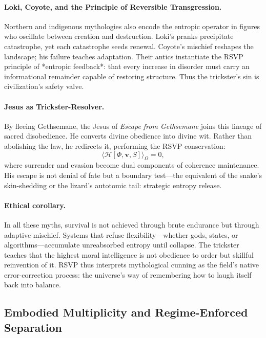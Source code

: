 \documentclass[12pt]{article}
\begin{document}
\paragraph{Loki, Coyote, and the Principle of Reversible Transgression.}
Northern and indigenous mythologies also encode the entropic operator in figures who oscillate between creation and destruction.  
Loki’s pranks precipitate catastrophe, yet each catastrophe seeds renewal.  
Coyote’s mischief reshapes the landscape; his failure teaches adaptation.  
Their antics instantiate the RSVP principle of *entropic feedback*: that every increase in disorder must carry an informational remainder capable of restoring structure.  
Thus the trickster’s sin is civilization’s safety valve.

\paragraph{Jesus as Trickster-Resolver.}
By fleeing Gethsemane, the Jesus of \emph{Escape from Gethsemane} joins this lineage of sacred disobedience.  
He converts divine obedience into divine wit.  
Rather than abolishing the law, he redirects it, performing the RSVP conservation:
\[
\langle \mathcal{H}[\Phi,\mathbf{v},S] \rangle_\Omega = 0,
\]
where surrender and evasion become dual components of coherence maintenance.  
His escape is not denial of fate but a boundary test—the equivalent of the snake’s skin-shedding or the lizard’s autotomic tail: strategic entropy release.

\paragraph{Ethical corollary.}
In all these myths, survival is not achieved through brute endurance but through adaptive mischief.  
Systems that refuse flexibility—whether gods, states, or algorithms—accumulate unreabsorbed entropy until collapse.  
The trickster teaches that the highest moral intelligence is not obedience to order but skillful reinvention of it.  
RSVP thus interprets mythological cunning as the field’s native error-correction process: the universe’s way of remembering how to laugh itself back into balance.

\subsection{Embodied Multiplicity and Regime-Enforced Separation}
\label{sec:casting-rsvp}
\end{document}
